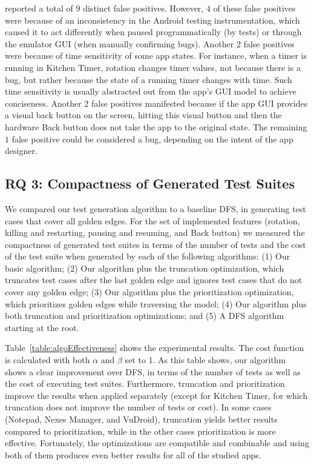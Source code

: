 \tool{} reported a total of $9$ distinct false positives. However, $4$ of these false positives were because of an inconsistency in the Android testing instrumentation, which caused it to act differently when paused programmatically (by tests) or through the emulator GUI (when manually confirming bugs). Another $2$ false positives were because of time sensitivity of some app states. For instance, when a timer is running in Kitchen Timer, rotation changes timer values, not because there is a bug, but rather because the state of a running timer changes with time. Such time sensitivity is usually abstracted out from the app's GUI model to achieve conciseness. Another $2$ false positives manifested because if the app GUI provides a visual back button on the screen, hitting this visual button and then the hardware Back button does not take the app to the original state. The remaining $1$ false positive could be considered a bug, depending on the intent of the app designer.

\subsection{RQ 3: Compactness of Generated Test Suites}
We compared our test generation algorithm to a baseline DFS, in generating test cases that cover all golden edges. For the set of implemented features (rotation, killing and restarting, pausing and resuming, and Back button) we measured the compactness of generated test suites in terms of the number of tests and the cost of the test suite when generated by each of the following algorithms:
(1) Our basic algorithm;
(2) Our algorithm plus the truncation optimization, which truncates test cases after the last golden edge and ignores test cases that do not cover any golden edge;
(3) Our algorithm plus the prioritization optimization, which prioritizes golden edges while traversing the model;
(4) Our algorithm plus both truncation and prioritization optimizations; and
(5) A DFS algorithm starting at the root.

Table~\ref{table:algoEffectiveness} shows the experimental results. The cost function is calculated with both $\alpha$ and $\beta$ set to 1. As this table shows, our algorithm shows a clear improvement over DFS, in terms of the number of tests as well as the cost of executing test suites. Furthermore, truncation and prioritization improve the results when applied separately (except for Kitchen Timer, for which truncation does not improve the number of tests or cost). In some cases (Notepad, Nexes Manager, and VuDroid), truncation yields better results compared to prioritization, while in the other cases prioritization is more effective. Fortunately, the optimizations are compatible and combinable and using both of them produces even better results for all of the studied apps.

